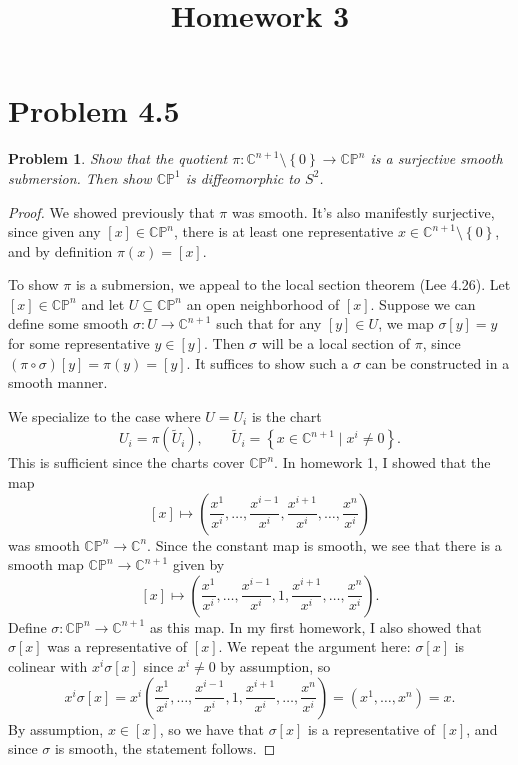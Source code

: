 \documentclass[11pt, letterpaper]{article}
\title{Homework 3}
\theoremstyle{plain}
\newtheorem{problem}{Problem}[section]
\begin{document}
\makeproblem
\section{Problem 4.5}

\begin{problem}
	Show that the quotient $\pi : \mathbb{C} ^{n+1} \setminus \left\{ 0 \right\}  \to \mathbb{C} \mathbb{P} ^n$ is a surjective smooth submersion. Then show $\mathbb{C}\mathbb{P} ^1$ is diffeomorphic to $S^2$.
\end{problem}
\begin{proof}
	We showed previously that $\pi $ was smooth. It's also manifestly surjective, since given any $[x]\in\mathbb{C} \mathbb{P} ^n$, there is at least one representative $x\in\mathbb{C} ^{n+1} \setminus \left\{ 0 \right\} $, and by definition $\pi (x)=[x]$.

	To show $\pi $ is a submersion, we appeal to the local section theorem (Lee 4.26). Let $[x]\in\mathbb{C} \mathbb{P} ^n$ and let $U\subseteq \mathbb{C} \mathbb{P} ^n$ an open neighborhood of $[x]$. Suppose we can define some smooth $\sigma : U \to \mathbb{C} ^{n+1} $ such that for any $[y]\in U$, we map $\sigma [y]=y$ for some representative $y\in[y]$. Then $\sigma $ will be a local section of $\pi $, since $(\pi \circ \sigma )[y]=\pi (y)=[y]$. It suffices to show such a $\sigma $ can be constructed in a smooth manner.

	We specialize to the case where $U=U_i$ is the chart
	\[
		U_i=\pi (\widetilde{U}_i),\qquad \widetilde{U} _i=\left\{ x\in\mathbb{C} ^{n+1} \mid x^i\neq 0 \right\} 
	.\]
	This is sufficient since the charts cover $\mathbb{C} \mathbb{P} ^n$. In homework 1, I showed that the map
	\[
		[x]\mapsto \left( \frac{x^1}{x^i} ,\ldots ,\frac{x^{i-1} }{x^i} ,\frac{x^{i+1} }{x^i} ,\ldots ,\frac{x^n}{x^i}  \right)
	\]
	was smooth $\mathbb{C} \mathbb{P} ^n\to \mathbb{C} ^n$. Since the constant map is smooth, we see that there is a smooth map $\mathbb{C} \mathbb{P} ^n\to \mathbb{C} ^{n+1} $ given by
	\[
		[x]\mapsto \left( \frac{x^1}{x^i} ,\ldots ,\frac{x^{i-1} }{x^i} ,1,\frac{x^{i+1} }{x^i} ,\ldots ,\frac{x^n}{x^i}  \right)
	.\]
	Define $\sigma : \mathbb{C} \mathbb{P} ^n \to \mathbb{C} ^{n+1} $ as this map. In my first homework, I also showed that $\sigma [x]$ was a representative of $[x]$. We repeat the argument here: $\sigma [x]$ is colinear with $x^i\sigma [x]$ since $x^i\neq 0$ by assumption, so
	\[
		x^i\sigma [x]=x^i\left( \frac{x^1}{x^i} ,\ldots ,\frac{x^{i-1} }{x^i} ,1,\frac{x^{i+1} }{x^i} ,\ldots ,\frac{x^n}{x^i}  \right)=\left( x^1, \ldots ,x^n \right) =x
	.\]
	By assumption, $x\in[x]$, so we have that $\sigma [x]$ is a representative of $[x]$, and since $\sigma $ is smooth, the statement follows.


\end{proof}
\end{document}
